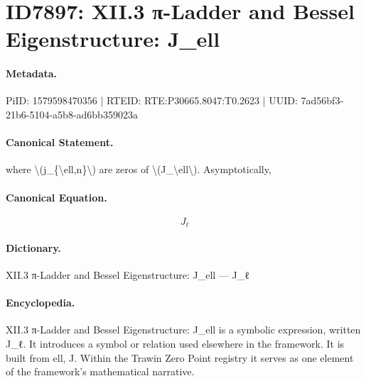 \section*{ID7897: XII.3 π-Ladder and Bessel Eigenstructure: J\_ell}
\paragraph{Metadata.}
PiID: 1579598470356 | RTEID: RTE:P30665.8047:T0.2623 | UUID: 7ad56bf3-21b6-5104-a5b8-ad6bb359023a

\paragraph{Canonical Statement.}
where \textbackslash{}(j\_\{\textbackslash{}ell,n\}\textbackslash{}) are zeros of \textbackslash{}(J\_\textbackslash{}ell\textbackslash{}). Asymptotically,

\paragraph{Canonical Equation.}
\[
J_\ell
\]

\paragraph{Dictionary.}
XII.3 π-Ladder and Bessel Eigenstructure: J\_ell — J\_ℓ

\paragraph{Encyclopedia.}
XII.3 π-Ladder and Bessel Eigenstructure: J\_ell is a symbolic expression, written J\_ℓ. It introduces a symbol or relation used elsewhere in the framework. It is built from ell, J. Within the Trawin Zero Point registry it serves as one element of the framework's mathematical narrative.
